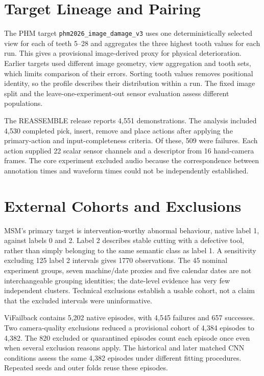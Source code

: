 \section{Target Lineage and Pairing}

The PHM target \nolinkurl{phm2026_image_damage_v3} uses one deterministically selected
view for each of teeth 5--28 and aggregates the three highest tooth values for each run.
This gives a provisional image-derived proxy for physical deterioration. Earlier targets
used different image geometry, view aggregation and tooth sets, which limits comparison
of their errors. Sorting tooth values removes positional identity, so the profile
describes their distribution within a run. The fixed image split and the
leave-one-experiment-out sensor evaluation assess different populations.

The REASSEMBLE release reports 4,551 demonstrations. The analysis included 4,530
completed pick, insert, remove and place actions after applying the primary-action and
input-completeness criteria. Of these, 509 were failures. Each action supplied 22 scalar
sensor channels and a descriptor from 16 hand-camera frames. The core experiment
excluded audio because the correspondence between annotation times and waveform times
could not be independently established.

\section{External Cohorts and Exclusions}

MSM's primary target is intervention-worthy abnormal behaviour, native label 1, against
labels 0 and 2. Label 2 describes stable cutting with a defective tool, rather than
simply belonging to the same semantic class as label 1. A sensitivity excluding 125
label 2 intervals gives 1770 observations. The 45 nominal experiment groups, seven
machine/date proxies and five calendar dates are not interchangeable grouping
identities; the date-level evidence has very few independent clusters. Technical
exclusions establish a usable cohort, not a claim that the excluded intervals were
uninformative.

ViFailback contains 5,202 native episodes, with 4,545 failures and 657 successes. Two
camera-quality exclusions reduced a provisional cohort of 4,384 episodes to 4,382. The
820 excluded or quarantined episodes count each episode once even when several exclusion
reasons apply. The historical and later matched CNN conditions assess the same 4,382
episodes under different fitting procedures. Repeated seeds and outer folds reuse these
episodes.

